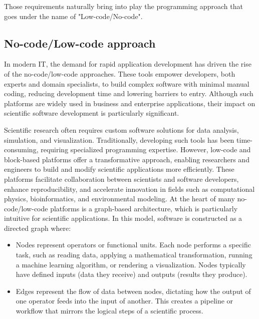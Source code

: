 \documentclass[a4paper,12pt]{article}
\begin{document}
Those requirements naturally bring into play the programming approach that goes under the name of "Low-code/No-code".

\subsection{\textcolor{EUblue}{No-code/Low-code approach}}

In modern IT, the demand for rapid application development has driven the rise of the no-code/low-code approaches. These tools empower developers, both experts and domain specialists, to build complex software with minimal manual coding, reducing development time and lowering barriers to entry. Although such platforms are widely used in business and enterprise applications, their impact on scientific software development is particularly significant.

Scientific research often requires custom software solutions for data analysis, simulation, and visualization. Traditionally, developing such tools has been time-consuming, requiring specialized programming expertise. However, low-code and block-based platforms offer a transformative approach, enabling researchers and engineers to build and modify scientific applications more efficiently. These platforms facilitate collaboration between scientists and software developers, enhance reproducibility, and accelerate innovation in fields such as computational physics, bioinformatics, and environmental modeling.
At the heart of many no-code/low-code platforms is a graph-based architecture, which is particularly intuitive for scientific applications. In this model, software is constructed as a directed graph where:

\begin{itemize}
\item Nodes represent operators or functional units. Each node performs a specific task, such as reading data, applying a mathematical transformation, running a machine learning algorithm, or rendering a visualization. Nodes typically have defined inputs (data they receive) and outputs (results they produce).

\item Edges represent the flow of data between nodes, dictating how the output of one operator feeds into the input of another. This creates a pipeline or workflow that mirrors the logical steps of a scientific process.
\end{itemize}
\end{document}
